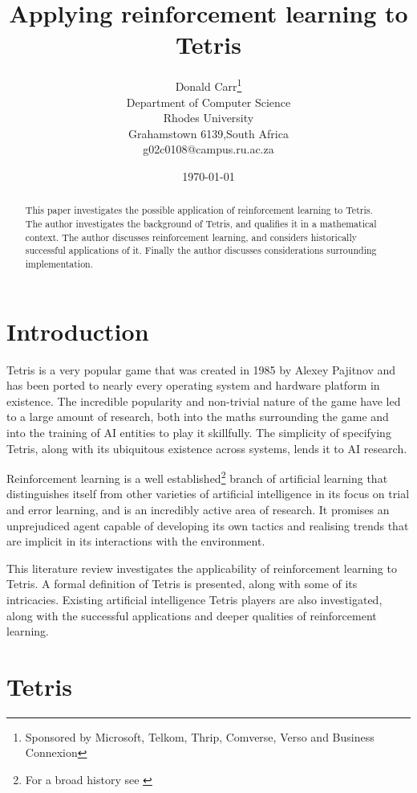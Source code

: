 \documentclass[a4paper]{article}%
\title{Applying reinforcement learning to Tetris}
\author{Donald Carr\thanks{Sponsored by Microsoft, Telkom, Thrip, Comverse, Verso and Business Connexion} \\ Department of Computer Science \\ Rhodes University \\ Grahamstown 6139,South Africa \\ g02c0108@campus.ru.ac.za}
\date{\today}
\begin{document}
\maketitle
\begin{abstract}
This paper investigates the possible application of reinforcement learning to Tetris. The author investigates the background of Tetris, and qualifies it in a mathematical context. The author discusses reinforcement learning, and considers historically successful applications of it. Finally the author discusses considerations surrounding implementation. 
\end{abstract}

\section{Introduction}

Tetris is a very popular game that was created in 1985 by Alexey Pajitnov and has been ported to nearly every operating system and hardware platform in existence. The incredible popularity and non-trivial nature of the game have led to a large amount of research, both into the maths surrounding the game and into the training of AI entities to play it skillfully. The simplicity of specifying Tetris, along with its ubiquitous existence across systems, lends it to AI research.

Reinforcement learning is a well established\footnote{For a broad history see \citep{suttonbarto}} branch of artificial learning that distinguishes itself from other varieties of artificial intelligence in its focus on trial and error learning, and is an incredibly active area of research. It promises an unprejudiced agent capable of developing its own tactics and realising trends that are implicit in its interactions with the environment. 

This literature review investigates the applicability of reinforcement learning to Tetris. A formal definition of Tetris is presented, along with some of its intricacies. Existing artificial intelligence Tetris players are also investigated, along with the successful applications and deeper qualities of reinforcement learning.

\clearpage

\section{Tetris}
\end{document}
